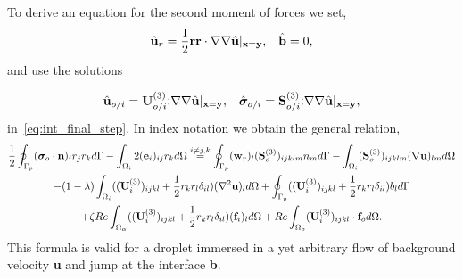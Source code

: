 To derive an equation for the second moment of forces we set,
\begin{align}
    \hat{\textbf{u}}_r =\frac{1}{2}\textbf{rr}\cdot  \mathbf{\nabla}\mathbf{\nabla} \hat{\textbf{u}}|_{\textbf{x}=\textbf{y}},
    &&
    \hat{\textbf{b}} = 0, 
\end{align}
and use the solutions
\begin{align}    
    \hat{\textbf{u}}_{o/i} = \textbf{U}_{o/i}^{(3)} \vdots \mathbf{\nabla}\mathbf{\nabla}\hat{\textbf{u}}|_{\textbf{x}=\textbf{y}}, 
    &&
    \hat{\bm\sigma}_{o/i} = \textbf{S}_{o/i}^{(3)} \vdots \mathbf{\nabla}\mathbf{\nabla}\hat{\textbf{u}}|_{\textbf{x}=\textbf{y}},
\end{align}
in~\ref{eq:int_final_step}. 
In index notation we obtain the general relation, 
\begin{multline}
    \frac{1}{2}\intS[p]{  (\bm\sigma_{o}\cdot \textbf{n})_i r_jr_k}
    - \intO[i]{2(\textbf{e}_i )_{ij} r_k}
    \overset{i\neq j,k}{=}
    \intS[p]{(\textbf{w}_{r})_l (\textbf{S}^{(3)}_{o})_{ijklm} n_m}
    - \intO[i]{(\textbf{S}^{(3)}_{o})_{ijklm} (\grad\textbf{u})_{lm}}\\
    - (1-\lambda) \intO[i]{((\textbf{U}^{(3)}_{i})_{ijkl} + \frac{1}{2}r_kr_l\delta_{il})(\grad^2 \textbf{u})_l }
    + \intS[p]{((\textbf{U}^{(3)}_{i})_{ijkl} + \frac{1}{2}r_kr_l\delta_{il}) b_l}\\
    + \zeta Re \intO{((\textbf{U}^{(3)}_{i})_{ijkl} + \frac{1}{2}r_kr_l\delta_{il}) (\textbf{f}_{i})_l} 
    + Re\intO[o]{(\textbf{U}^{(3)}_{i})_{ijkl}\cdot \textbf{f}_{o}}.
    \label{eq:first_formula}
\end{multline}
This formula is valid for a droplet immersed in a yet arbitrary flow of background velocity \textbf{u} and jump at the interface \textbf{b}.

